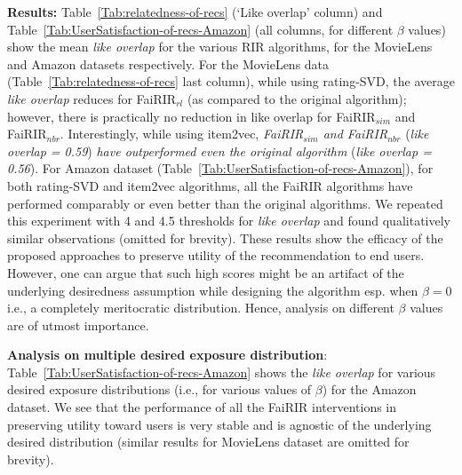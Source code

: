 \vspace{1 mm}
\noindent \textbf{Results:}  Table~\ref{Tab:relatedness-of-recs} (`Like overlap' column) and Table~\ref{Tab:UserSatisfaction-of-recs-Amazon} (all columns, for different $\beta$ values) show the mean {\it like overlap} for the various RIR algorithms, for the MovieLens and Amazon datasets respectively. 
For the MovieLens data (Table~\ref{Tab:relatedness-of-recs} last column), while using rating-SVD, the average {\it like overlap} reduces for FaiRIR$_{rl}$ (as compared to the original algorithm); however, there is practically no reduction in like overlap for FaiRIR$_{sim}$ and FaiRIR$_{nbr}$.  
Interestingly, while using item2vec, {\it FaiRIR$_{sim}$ and FaiRIR$_{nbr}$} ({\it like overlap = 0.59}) {\it have outperformed even the original algorithm} ({\it like overlap = 0.56}). 
For Amazon dataset (Table~\ref{Tab:UserSatisfaction-of-recs-Amazon}), for both rating-SVD and item2vec algorithms, all the FaiRIR algorithms have performed comparably or even better than the original algorithms. We repeated this experiment with 4 and 4.5 thresholds for {\it like overlap} and found qualitatively similar observations (omitted for brevity). These results show the efficacy of the proposed approaches to preserve utility of the recommendation to end users. However, one can argue that such high scores might be an artifact of the underlying desiredness assumption while designing the algorithm esp. when $\beta = 0$ i.e., a completely meritocratic distribution. Hence, analysis on different $\beta$ values are of utmost importance.%

\noindent
\textbf{Analysis on multiple desired exposure distribution}: Table~\ref{Tab:UserSatisfaction-of-recs-Amazon} shows the {\it like overlap} for various desired exposure distributions (i.e., for various values of $\beta$) for the Amazon dataset. 
We see that the performance of all the FaiRIR interventions in preserving utility toward users is very stable and is agnostic of the underlying desired distribution (similar results for MovieLens dataset are omitted for brevity).